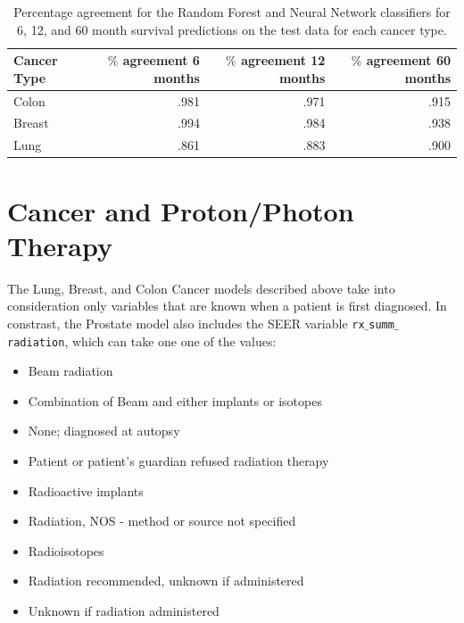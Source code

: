\documentclass[a4paper,11pt]{article}
\newcommand{\codewhite}[1]{\colorbox{white}{\texttt{#1}}}
\begin{document}
\begin{table}[tbp]
\begin{center}
\begin{tabular}{lrrr}
\toprule
Cancer Type & $\%$ agreement 6 months & $\%$ agreement 12 months & $\%$ agreement 60 months \\ 
\midrule
Colon & .981 & .971 & .915 \\  
Breast & .994 & .984 & .938 \\  
Lung & .861 & .883 & .900 \\  
\bottomrule
\end{tabular}
\caption{\label{tab:agree} Percentage agreement for the Random Forest and Neural Network classifiers for 6, 12, and 60 month survival predictions on the test data for each cancer type.}
\end{center}
\end{table}





\section{Cancer and Proton/Photon Therapy}

The Lung, Breast, and Colon Cancer models described above take into consideration only variables that are known when a patient is first diagnosed. In constrast, the Prostate model also includes the SEER variable \codewhite{rx$\_$summ$\_$radiation}, which can take one one of the values:

\begin{itemize}[noitemsep]
\item Beam radiation
\item Combination of Beam and either implants or isotopes
\item None; diagnosed at autopsy
\item Patient or patient's guardian refused radiation therapy
\item Radioactive implants
\item Radiation, NOS - method or source not specified
\item Radioisotopes
\item Radiation recommended, unknown if administered
\item Unknown if radiation administered
\end{itemize}
\end{document}
